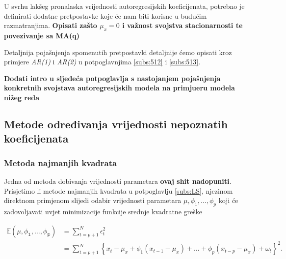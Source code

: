 \documentclass[a4paper,12pt,oneside]{memoir}
\begin{document}
            U svrhu lakšeg pronalaska vrijednosti autoregresijskih koeficijenata, potrebno je definirati dodatne pretpostavke koje će nam biti korisne u budućim razmatranjima. \textbf{Opisati zašto $\mu_x=0$ i važnost svojstva stacionarnosti te povezivanje sa MA(q)}
            
            
            Detaljnija pojašnjenja spomenutih pretpostavki detaljnije ćemo opisati kroz primjere \textit{AR(1)} i \textit{AR(2)} u potpoglavnjima \ref{subs:512} i \ref{subs:513}.
            
            
            


            \textbf{Dodati intro u sljedeća potpoglavlja s nastojanjem pojašnjenja konkretnih svojstava autoregresijskih modela na primjueru modela nižeg reda}

            \subsection{Metode određivanja vrijednosti nepoznatih koeficijenata}


            \subsubsection{Metoda najmanjih kvadrata}

            Jedna od metoda dobivanja vrijednosti parametara \textbf{ovaj shit nadopuniti}. Prisjetimo li metode najmanjih kvadrata u potpoglavlju \ref{subs:LS}, njezinom direktnom primjenom slijedi odabir vrijednosti parametara $\mu,\phi_1,\ldots,\phi_p$ koji će zadovoljavati uvjet minimizacije funkcije srednje kvadratne greške
            
            \begin{equation}
                \begin{split}
                    \mathbb{E(\mu,\phi_1,\ldots,\phi_p)}&=\displaystyle\sum_{t=p+1}^N\epsilon_t^2\\
                    & =\displaystyle\sum_{t=p+1}^N\left\{x_t-\mu_x+\phi_1\left(x_{t-1}-\mu_x\right)+\ldots+\phi_p\left(x_{t-p}-\mu_x\right)+\omega_t\right\}^2.
                \end{split}
                \label{eq:58}
            \end{equation}
\end{document}
